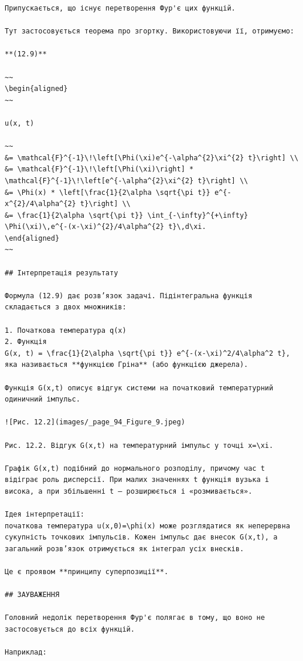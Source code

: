 \documentclass[
  ukrainian,
]{article}
\begin{document}
\begin{verbatim}
Припускається, що існує перетворення Фур'є цих функцій.

Тут застосовується теорема про згортку. Використовуючи її, отримуємо:

**(12.9)**

~~
\begin{aligned}
~~

u(x, t)

~~
&= \mathcal{F}^{-1}\!\left[\Phi(\xi)e^{-\alpha^{2}\xi^{2} t}\right] \\
&= \mathcal{F}^{-1}\!\left[\Phi(\xi)\right] * \mathcal{F}^{-1}\!\left[e^{-\alpha^{2}\xi^{2} t}\right] \\
&= \Phi(x) * \left[\frac{1}{2\alpha \sqrt{\pi t}} e^{-x^{2}/4\alpha^{2} t}\right] \\
&= \frac{1}{2\alpha \sqrt{\pi t}} \int_{-\infty}^{+\infty} \Phi(\xi)\,e^{-(x-\xi)^{2}/4\alpha^{2} t}\,d\xi.
\end{aligned}
~~

## Інтерпретація результату

Формула (12.9) дає розв’язок задачі. Підінтегральна функція складається з двох множників:

1. Початкова температура q(x)  
2. Функція  
G(x, t) = \frac{1}{2\alpha \sqrt{\pi t}} e^{-(x-\xi)^2/4\alpha^2 t},
яка називається **функцією Гріна** (або функцією джерела).

Функція G(x,t) описує відгук системи на початковий температурний одиничний імпульс.

![Рис. 12.2](images/_page_94_Figure_9.jpeg)

Рис. 12.2. Відгук G(x,t) на температурний імпульс у точці x=\xi.

Графік G(x,t) подібний до нормального розподілу, причому час t відіграє роль дисперсії. При малих значеннях t функція вузька і висока, а при збільшенні t — розширюється і «розмивається».

Ідея інтерпретації:  
початкова температура u(x,0)=\phi(x) може розглядатися як неперервна сукупність точкових імпульсів. Кожен імпульс дає внесок G(x,t), а загальний розв’язок отримується як інтеграл усіх внесків.

Це є проявом **принципу суперпозиції**.

## ЗАУВАЖЕННЯ

Головний недолік перетворення Фур'є полягає в тому, що воно не застосовується до всіх функцій.

Наприклад:
\end{verbatim}
\end{document}
